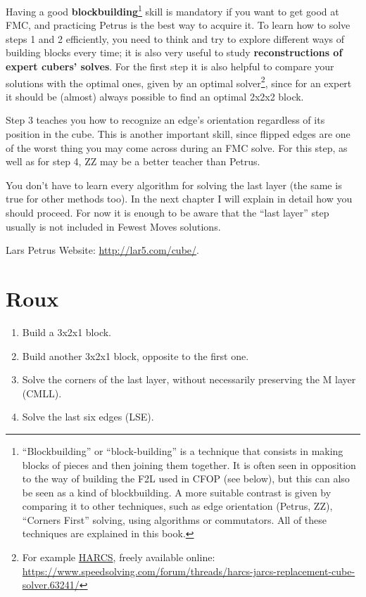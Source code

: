 \documentclass[11pt,a4paper]{book}
\begin{document}
Having a good \textbf{blockbuilding}\footnote{``Blockbuilding'' or ``block-building'' is a technique that consists in making blocks of pieces and then joining them together. It is often seen in opposition to the way of building the F2L used in CFOP (see below), but this can also be seen as a kind of blockbuilding. A more suitable contrast is given by comparing it to other techniques, such as edge orientation (Petrus, ZZ), ``Corners First'' solving, using algorithms or commutators. All of these techniques are explained in this book.} skill is mandatory if you want to get good at FMC, and practicing Petrus is the best way to acquire it. To learn how to solve steps 1 and 2 efficiently, you need to think and try to explore different ways of building blocks every time; it is also very useful to study \textbf{reconstructions of expert cubers' solves}. For the first step it is also helpful to compare your solutions with the optimal ones, given by an optimal solver\footnote{For example \href{https://www.speedsolving.com/forum/threads/harcs-jarcs-replacement-cube-solver.63241/}{HARCS}, freely available online: \url{https://www.speedsolving.com/forum/threads/harcs-jarcs-replacement-cube-solver.63241/}}, since for an expert it should be (almost) always possible to find an optimal 2x2x2 block.

Step 3 teaches you how to recognize an edge's orientation regardless of its position in the cube. This is another important skill, since flipped edges are one of the worst thing you may come across during an FMC solve. For this step, as well as for step 4, ZZ may be a better teacher than Petrus.

You don't have to learn every algorithm for solving the last layer (the same is true for other methods too). In the next chapter I will explain in detail how you should proceed. For now it is enough to be aware that the ``last layer'' step usually is not included in Fewest Moves solutions.

Lars Petrus Website: \url{http://lar5.com/cube/}.

\section{Roux}

\begin{enumerate}
\item Build a 3x2x1 block.
\item Build another 3x2x1 block, opposite to the first one.
\item Solve the corners of the last layer, without necessarily preserving the M layer (CMLL).
\item Solve the last six edges (LSE).
\end{enumerate}
\end{document}
